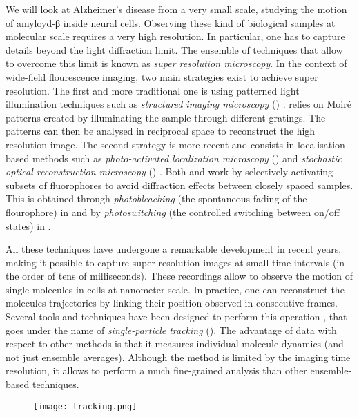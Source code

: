 We will look at Alzheimer's disease from a very small scale, studying the motion of amyloyd-β inside neural cells. Observing these kind of biological samples at molecular scale requires a very high resolution. In particular, one has to capture details beyond the light diffraction limit. The ensemble of techniques that allow to overcome this limit is known as \emph{super resolution microscopy}. In the context of wide-field flourescence imaging, two main strategies exist to achieve super resolution. The first and more traditional one is using patterned light illumination techniques such as \emph{structured imaging microscopy} () .  relies on Moiré patterns created by illuminating the sample through different gratings. The patterns can then be analysed in reciprocal space to reconstruct the high resolution image. The second strategy is more recent and consists in localisation based methods such as \emph{photo-activated localization microscopy} ()  and \emph{stochastic optical reconstruction microscopy} () . Both  and  work by selectively activating subsets of fluorophores to avoid diffraction effects between closely spaced samples. This is obtained through \emph{photobleaching} (the spontaneous fading of the flourophore) in  and by \emph{photoswitching} (the controlled switching between on/off states) in .

All these techniques have undergone a remarkable development in recent years, making it possible to capture super resolution images at small time intervals (in the order of tens of milliseconds). These recordings allow to observe the motion of single molecules in cells at nanometer scale. In practice, one can reconstruct the molecules trajectories by linking their position observed in consecutive frames. Several tools and techniques have been designed to perform this operation , that goes under the name of \emph{single-particle tracking} (). The advantage of  data with respect to other methods is that it measures individual molecule dynamics (and not just ensemble averages). Although the method is limited by the imaging time resolution, it allows to perform a much fine-grained analysis than other ensemble-based techniques.

\begin{figure}
  \label{fig:tracking}
  \texttt{[image: tracking.png]}
\end{figure}

